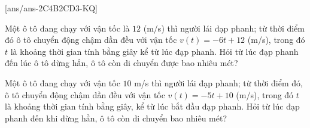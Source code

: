 \TNSA
{}[ans/ans-2C4B2CD3-KQ]
\begin{ex}%
	Một ô tô đang chạy với vận tốc là $12$ (m/s) thì người lái đạp phanh; từ thời điểm đó ô tô chuyển động chậm dần đều với vận tốc $v \left(t\right) = -6t+12$ (m/s), trong đó $t$ là khoảng thời gian tính bằng giây kể từ lúc đạp phanh. Hỏi từ lúc đạp phanh đến lúc ô tô dừng hẳn, ô tô còn di chuyển được bao nhiêu mét?
\end{ex}

\begin{ex}%
	Một ô tô đang chạy với vận tốc $10$ m/s thì người lái đạp phanh; từ thời điểm đó, ô tô chuyển động chậm dần đều với vận tốc $v \left(t\right) = -5t+10$ (m/s), trong đó $t$ là khoảng thời gian tính bằng giây, kể từ lúc bắt đầu đạp phanh. Hỏi từ lúc đạp phanh đến khi dừng hẳn, ô tô còn di chuyển bao nhiêu mét?
\end{ex}

